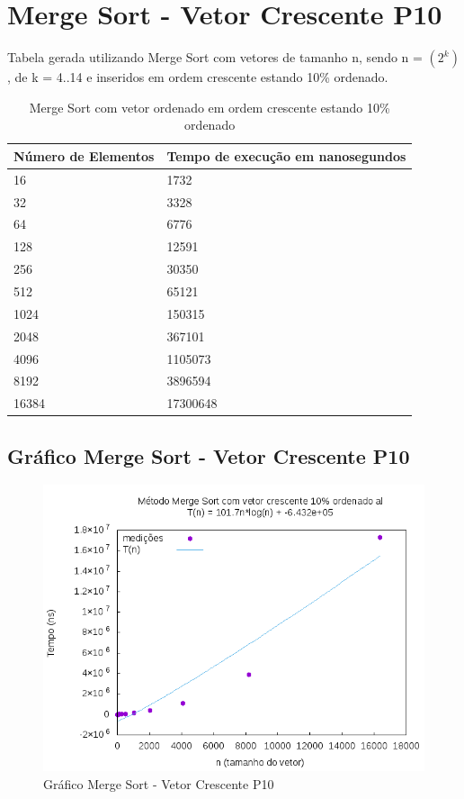 \documentclass[12pt,a4paper,twoside]{report}
\begin{document}
\section{Merge Sort - Vetor Crescente P10}
Tabela gerada utilizando Merge Sort com vetores de tamanho n, sendo n = $(2^k)$, de k = 4..14 e inseridos em ordem crescente estando 10\% ordenado.
\begin{table}[H]
\centering
\caption{Merge Sort com vetor ordenado em ordem crescente estando 10\% ordenado}
\label{my-label}
\begin{tabular}{|l|l|}
\hline
\multicolumn{1}{|c|}{\textbf{Número de Elementos}} & \multicolumn{1}{c|}{\textbf{Tempo de execução em nanosegundos}} \\ \hline
16 & 1732 \\ \hline
32 & 3328 \\ \hline
64 & 6776 \\ \hline
128 & 12591 \\ \hline
256 & 30350 \\ \hline
512 & 65121 \\ \hline
1024 & 150315 \\ \hline
2048 & 367101 \\ \hline
4096 & 1105073 \\ \hline
8192 & 3896594 \\ \hline
16384 & 17300648 \\ \hline
\end{tabular}
\end{table}

\subsection{Gráfico Merge Sort - Vetor Crescente P10}
\begin{figure}[H]
    \centering
    \includegraphics[width=0.7\linewidth]{graficos/MergeSort/vIntCrescenteP10/vIntCrescenteP10.png}
  \caption{Gráfico Merge Sort - Vetor Crescente P10}
\end{figure}
\end{document}
